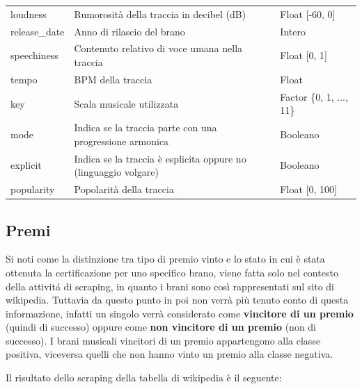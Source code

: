 \begin{center}
{\begin{tabular}[H]{ |l|l|l| }
			loudness & 
			Rumorosità della traccia in decibel (dB) &
			Float [-60, 0]\\
			
			release\_date & 
			Anno di rilascio del brano&
			Intero\\
			
			speechiness & 
			Contenuto relativo di voce umana nella traccia &
			Float [0, 1]\\
			
			tempo & 
			BPM della traccia &
			Float\\
			
			key & 
			Scala musicale utilizzata &
			Factor \{0, 1, ..., 11\}\\
			
			mode & 
			Indica se la traccia parte con una progressione armonica &
			Booleano\\
			
			explicit & 
			Indica se la traccia è esplicita oppure no (linguaggio volgare) &
			Booleano\\
			
			popularity & 
			Popolarità della traccia &
			Float [0, 100]\\
			
			\hline
			
		\end{tabular}
	}
\end{center}

\subsection{Premi}
Si noti come la distinzione tra tipo di premio vinto e lo stato in cui
è stata ottenuta la certificazione per uno specifico brano, viene
fatta solo nel contesto della attivitá di scraping, in quanto i brani
sono così rappresentati sul sito di wikipedia. Tuttavia da questo
punto in poi non verrà più tenuto conto di questa informazione,
infatti un singolo verrà considerato come\textbf{ vincitore di un
  premio} (quindi di successo) oppure come \textbf{non vincitore di
  un premio} (non di successo). I brani musicali vincitori di un premio appartengono alla classe positiva, viceversa quelli che non hanno vinto un premio alla classe negativa.

Il risultato dello scraping della tabella di wikipedia è il seguente:

